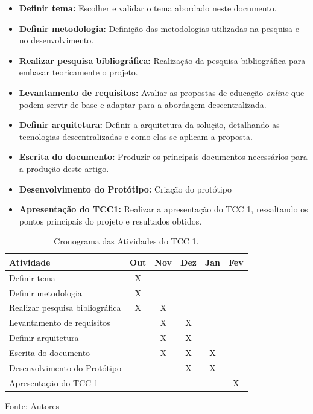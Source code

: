 \begin{itemize}
    \item \textbf{Definir tema:} Escolher e validar o tema abordado neste documento.
    \item \textbf{Definir metodologia:} Definição das metodologias utilizadas na pesquisa e no desenvolvimento.
    \item \textbf{Realizar pesquisa bibliográfica:} Realização da pesquisa bibliográfica para embasar teoricamente o projeto.
    \item \textbf{Levantamento de requisitos:} Avaliar as propostas de educação \textit{online} que podem servir de base e adaptar para a abordagem descentralizada.
    \item \textbf{Definir arquitetura:} Definir a arquitetura da solução, detalhando as tecnologias descentralizadas e como elas se aplicam a proposta.
    \item \textbf{Escrita do documento:} Produzir os principais documentos necessários para a produção deste artigo.
    \item \textbf{Desenvolvimento do Protótipo:} Criação do protótipo 
    \item \textbf{Apresentação do TCC1:} Realizar a apresentação do TCC 1, ressaltando os pontos principais do projeto e resultados obtidos.
\end{itemize}

\begin{table}[h]
    \centering
    \caption{Cronograma das Atividades do TCC 1.}
    \label{tab:cronograma_tcc1}
    \begin{adjustbox}{width=\textwidth}
    \begin{tabular}{|l|c|c|c|c|c|}
        \hline
        \textbf{Atividade} & \textbf{Out} & \textbf{Nov} & \textbf{Dez} & \textbf{Jan} & \textbf{Fev} \\
        \hline
        Definir tema & X &  &  &  &  \\
        Definir metodologia & X &  &  &  &  \\
        Realizar pesquisa bibliográfica & X & X &  &  &  \\
        Levantamento de requisitos &  & X & X &  &  \\
        Definir arquitetura &  & X & X &  &  \\
        Escrita do documento &  & X & X & X &  \\
        Desenvolvimento do Protótipo &  &  & X & X &  \\
        Apresentação do TCC 1 &  &  &  &  & X \\
        \hline
    \end{tabular}
    \end{adjustbox}
    \vspace{5mm}
    {\footnotesize Fonte: Autores}
\end{table}

